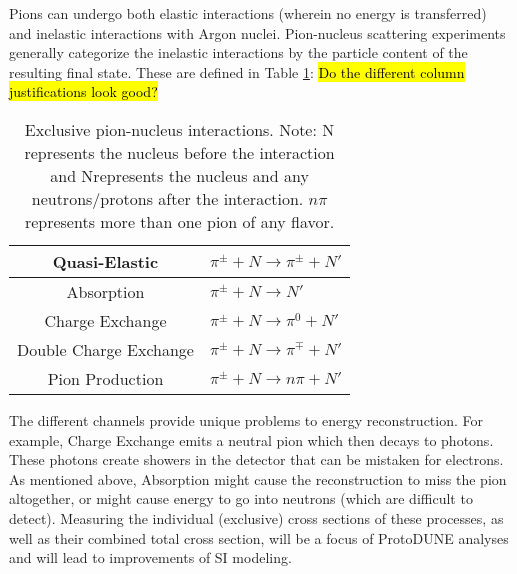 \documentclass[12pt]{article}
\begin{document}
	Pions can undergo both elastic interactions (wherein no energy is transferred) and inelastic interactions with Argon nuclei. Pion-nucleus scattering experiments generally categorize the inelastic interactions by the particle content of the resulting final state. These are defined in Table \ref{tab:interactions}:
\hl{Do the different column justifications look good?}
\begin{table}[htb!]
\begin{center}
  \begin{tabular}{| c | l |}
  \hline
  Quasi-Elastic & $\pi^{\pm} + N \rightarrow \pi^{\pm} + N'$ \\  
  \hline	
  Absorption & $\pi^{\pm} + N \rightarrow N'$ \\
  \hline  
  Charge Exchange & $\pi^{\pm} + N \rightarrow \pi^{0} + N'$ \\
  \hline
  Double Charge Exchange & $\pi^{\pm} + N \rightarrow \pi^{\mp} + N'$\\
  \hline
  Pion Production & $\pi^{\pm} + N \rightarrow  n\pi + N'$ \\
  \hline
  \end{tabular}
\end{center}\caption{Exclusive pion-nucleus interactions. Note: N represents the nucleus before the interaction and N\textquotesingle \space represents the nucleus and any neutrons/protons after the interaction. $n\pi$ represents more than one pion of any flavor.}\label{tab:interactions}
\end{table}
 
	
	The different channels provide unique problems to energy reconstruction. For example, Charge Exchange emits a neutral pion which then decays to photons. These photons create showers in the detector that can be mistaken for electrons. As mentioned above, Absorption might cause the reconstruction to miss the pion altogether, or might cause energy to go into neutrons (which are difficult to detect). Measuring the individual (exclusive) cross sections of these processes, as well as their combined total cross section, will be a focus of ProtoDUNE analyses and will lead to improvements of SI modeling. 
\\

\end{document}
